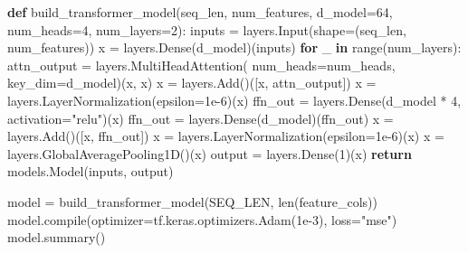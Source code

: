 \documentclass[
  letterpaper,
  DIV=11,
  numbers=noendperiod]{scrartcl}
\newenvironment{Shaded}{\begin{snugshade}}{\end{snugshade}}
\newcommand{\BuiltInTok}[1]{\textcolor[rgb]{0.00,0.23,0.31}{#1}}
\newcommand{\ControlFlowTok}[1]{\textcolor[rgb]{0.00,0.23,0.31}{\textbf{#1}}}
\newcommand{\DecValTok}[1]{\textcolor[rgb]{0.68,0.00,0.00}{#1}}
\newcommand{\FloatTok}[1]{\textcolor[rgb]{0.68,0.00,0.00}{#1}}
\newcommand{\KeywordTok}[1]{\textcolor[rgb]{0.00,0.23,0.31}{\textbf{#1}}}
\newcommand{\NormalTok}[1]{\textcolor[rgb]{0.00,0.23,0.31}{#1}}
\newcommand{\OperatorTok}[1]{\textcolor[rgb]{0.37,0.37,0.37}{#1}}
\newcommand{\StringTok}[1]{\textcolor[rgb]{0.13,0.47,0.30}{#1}}
\begin{document}
\begin{Shaded}
\begin{Highlighting}[]
\KeywordTok{def}\NormalTok{ build\_transformer\_model(seq\_len, num\_features, d\_model}\OperatorTok{=}\DecValTok{64}\NormalTok{, num\_heads}\OperatorTok{=}\DecValTok{4}\NormalTok{, num\_layers}\OperatorTok{=}\DecValTok{2}\NormalTok{):}
\NormalTok{    inputs }\OperatorTok{=}\NormalTok{ layers.Input(shape}\OperatorTok{=}\NormalTok{(seq\_len, num\_features))}
\NormalTok{    x }\OperatorTok{=}\NormalTok{ layers.Dense(d\_model)(inputs)}
    \ControlFlowTok{for}\NormalTok{ \_ }\KeywordTok{in} \BuiltInTok{range}\NormalTok{(num\_layers):}
\NormalTok{        attn\_output }\OperatorTok{=}\NormalTok{ layers.MultiHeadAttention(}
\NormalTok{            num\_heads}\OperatorTok{=}\NormalTok{num\_heads, key\_dim}\OperatorTok{=}\NormalTok{d\_model)(x, x)}
\NormalTok{        x }\OperatorTok{=}\NormalTok{ layers.Add()([x, attn\_output])}
\NormalTok{        x }\OperatorTok{=}\NormalTok{ layers.LayerNormalization(epsilon}\OperatorTok{=}\FloatTok{1e{-}6}\NormalTok{)(x)}
\NormalTok{        ffn\_out }\OperatorTok{=}\NormalTok{ layers.Dense(d\_model }\OperatorTok{*} \DecValTok{4}\NormalTok{, activation}\OperatorTok{=}\StringTok{"relu"}\NormalTok{)(x)}
\NormalTok{        ffn\_out }\OperatorTok{=}\NormalTok{ layers.Dense(d\_model)(ffn\_out)}
\NormalTok{        x       }\OperatorTok{=}\NormalTok{ layers.Add()([x, ffn\_out])}
\NormalTok{        x       }\OperatorTok{=}\NormalTok{ layers.LayerNormalization(epsilon}\OperatorTok{=}\FloatTok{1e{-}6}\NormalTok{)(x)}
\NormalTok{    x }\OperatorTok{=}\NormalTok{ layers.GlobalAveragePooling1D()(x)  }
\NormalTok{    output }\OperatorTok{=}\NormalTok{ layers.Dense(}\DecValTok{1}\NormalTok{)(x)}
    \ControlFlowTok{return}\NormalTok{ models.Model(inputs, output)}

\NormalTok{model }\OperatorTok{=}\NormalTok{ build\_transformer\_model(SEQ\_LEN, }\BuiltInTok{len}\NormalTok{(feature\_cols))}
\NormalTok{model.}\BuiltInTok{compile}\NormalTok{(optimizer}\OperatorTok{=}\NormalTok{tf.keras.optimizers.Adam(}\FloatTok{1e{-}3}\NormalTok{), loss}\OperatorTok{=}\StringTok{"mse"}\NormalTok{)}
\NormalTok{model.summary()}
\end{Highlighting}
\end{Shaded}
\end{document}
